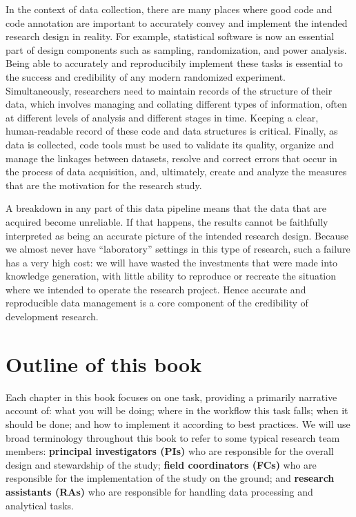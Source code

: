In the context of data collection, there are many places where good code and code annotation
are important to accurately convey and implement the intended research design in reality.
For example, statistical software is now an essential part of
design components such as sampling, randomization, and power analysis.
Being able to accurately and reproducibily implement these tasks
is essential to the success and credibility of any modern randomized experiment.
Simultaneously, researchers need to maintain records of the structure of their data,
which involves managing and collating different types of information,
often at different levels of analysis and different stages in time.
Keeping a clear, human-readable record of these code and data structures is critical.
Finally, as data is collected, code tools must be used to validate its quality,
organize and manage the linkages between datasets,
resolve and correct errors that occur in the process of data acquisition,
and, ultimately, create and analyze the measures that
are the motivation for the research study.

A breakdown in any part of this data pipeline
means that the data that are acquired become unreliable.
If that happens, the results cannot be faithfully interpreted
as being an accurate picture of the intended research design.
Because we almost never have ``laboratory'' settings in this type of research,
such a failure has a very high cost:
we will have wasted the investments that were made into knowledge generation,
with little ability to reproduce or recreate the situation
where we intended to operate the research project.
Hence accurate and reproducible data management is a core component
of the credibility of development research.

\section{Outline of this book}

Each chapter in this book focuses on one task, providing a primarily narrative account of:
what you will be doing; where in the workflow this task falls;
when it should be done; and how to implement it according to best practices.
We will use broad terminology throughout this book to refer to some typical research team members:
\textbf{principal investigators (PIs)} who are responsible for
the overall design and stewardship of the study;
\textbf{field coordinators (FCs)} who are responsible for
the implementation of the study on the ground;
and \textbf{research assistants (RAs)} who are responsible for
handling data processing and analytical tasks.

